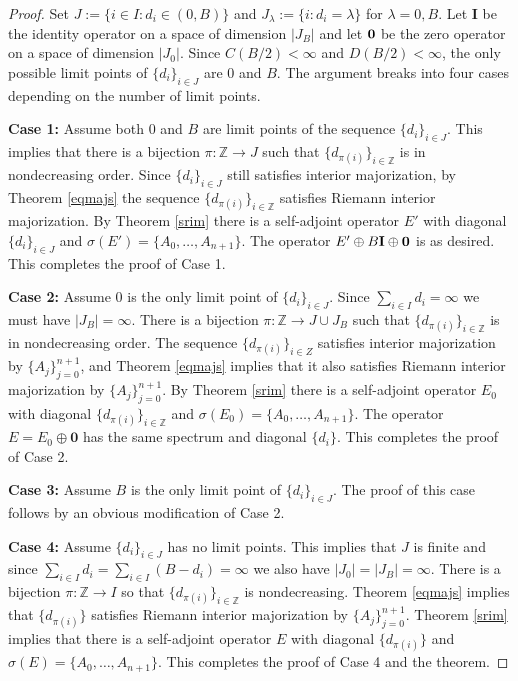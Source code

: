\documentclass[12pt]{amsart}
\newcounter{Theorem}
\numberwithin{equation}{section}
\numberwithin{Theorem}{section}
\theoremstyle{plain}
\theoremstyle{definition}
\theoremstyle{remark}
\begin{document}
\begin{proof} Set $J:=\{i\in I:d_{i}\in(0,B)\}$ and $J_{\lambda}:=\{i:d_{i}=\lambda\}$ for $\lambda=0,B$. Let ${\mathbf I}$ be the identity operator on a space of dimension $|J_{B}|$ and let $\bf{0}$ be the zero operator on a space of dimension $|J_{0}|$. Since $C(B/2)<\infty$ and $D(B/2)<\infty$, the only possible limit points of $\{d_{i}\}_{i\in J}$ are $0$ and $B$. The argument breaks into four cases depending on the number of limit points.

{\bf Case 1:} Assume both $0$ and $B$ are limit points of the sequence $\{d_{i}\}_{i\in J}$. This implies that there is a bijection $\pi:{\mathbb{Z}}\to J$ such that $\{d_{\pi(i)}\}_{i\in{\mathbb{Z}}}$ is in nondecreasing order. Since $\{d_{i}\}_{i\in J}$ still satisfies interior majorization, by Theorem \ref{eqmajs} the sequence $\{d_{\pi(i)}\}_{i\in {\mathbb{Z}}}$ satisfies Riemann interior majorization. By Theorem \ref{srim} there is a self-adjoint operator $E'$ with diagonal $\{d_{i}\}_{i\in J}$ and $\sigma(E')=\{A_0,\ldots,A_{n+1}\}$. The operator $E'\oplus B {\mathbf I}\oplus \bf{0}$ is as desired. This completes the proof of Case 1.

{\bf Case 2:} Assume $0$ is the only limit point of $\{d_{i}\}_{i\in J}$. Since $\sum_{i\in I}d_{i} = \infty$ we must have $|J_{B}|=\infty$. There is a bijection $\pi:{\mathbb{Z}}\to J\cup J_{B}$ such that $\{d_{\pi(i)}\}_{i\in{\mathbb{Z}}}$ is in nondecreasing order.  The sequence $\{d_{\pi(i)}\}_{i\in Z}$ satisfies interior majorization by $\{A_{j}\}_{j=0}^{n+1}$, and Theorem \ref{eqmajs} implies that it also satisfies Riemann interior majorization by $\{A_{j}\}_{j=0}^{n+1}$. By Theorem \ref{srim} there is a self-adjoint operator $E_{0}$ with diagonal $\{d_{\pi(i)}\}_{i\in {\mathbb{Z}}}$ and $\sigma(E_{0})=\{A_0,\ldots,A_{n+1}\}$. The operator $E=E_{0}\oplus\mathbf{0}$ has the same spectrum and diagonal $\{d_{i}\}$. This completes the proof of Case 2.

{\bf Case 3:} Assume $B$ is the only limit point of $\{d_{i}\}_{i\in J}$. The proof of this case follows by an obvious modification of Case 2.

{\bf Case 4:} Assume $\{d_{i}\}_{i\in J}$ has no limit points. This implies that $J$ is finite and since $\sum_{i\in I}d_{i} = \sum_{i\in I}(B-d_{i}) = \infty$ we also have $|J_{0}|=|J_{B}|=\infty$. There is a bijection $\pi:{\mathbb{Z}}\to I$ so that $\{d_{\pi(i)}\}_{i\in{\mathbb{Z}}}$ is nondecreasing. Theorem \ref{eqmajs} implies that $\{d_{\pi(i)}\}$ satisfies Riemann interior majorization by $\{A_{j}\}_{j=0}^{n+1}$. Theorem \ref{srim} implies that there is a self-adjoint operator $E$ with diagonal $\{d_{\pi(i)}\}$ and $\sigma(E) = \{A_0,\ldots,A_{n+1}\}$. This completes the proof of Case 4 and the theorem.
\end{proof}
\end{document}
